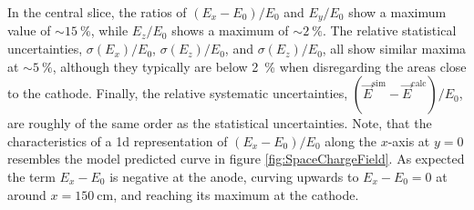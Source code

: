 In the central slice, the ratios of $(E_x-E_0)/E_0$ and $E_y/E_0$ show a maximum value of $\sim\SI{15}{\percent}$, while $E_z/E_0$ shows a maximum of $\sim\SI{2}{\percent}$. The relative statistical uncertainties, \ie $\sigma(E_x)/E_0$, $\sigma(E_z)/E_0$, and $\sigma(E_z)/E_0$, all show similar maxima at $\sim\SI{5}{\percent}$, although they typically are below \SI{2}{\percent} when disregarding the areas close to the cathode. Finally, the relative systematic uncertainties, \ie $(\vec{E}^{\text{sim}} - \vec{E}^{\text{calc}})/E_0$, are roughly of the same order as the statistical uncertainties. Note, that the characteristics of a \gls{1d} representation of $(E_x-E_0)/E_0$ along the $x$-axis at $y = 0$ resembles the model predicted curve in figure \ref{fig:SpaceChargeField}. As expected the term $E_x-E_0$ is negative at the anode, curving upwards to $E_x-E_0 = 0$ at around $x=\SI{150}{\centi\metre}$, and reaching its maximum at the cathode.

